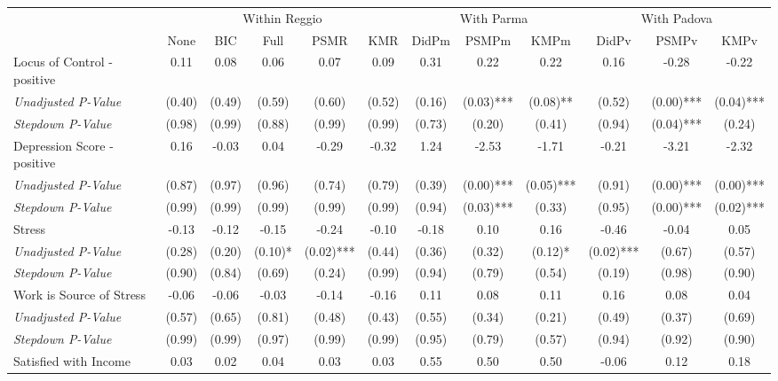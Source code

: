 \begin{tabular}{l c c c c c c c c c c c}
\toprule
& \multicolumn{5}{c}{Within Reggio} & \multicolumn{3}{c}{With Parma} & \multicolumn{3}{c}{With Padova} \\\cmidrule(lr){2-6} \cmidrule(lr){7-9} \cmidrule(lr){10-12}
 & None & BIC & Full & PSMR & KMR & DidPm & PSMPm & KMPm & DidPv & PSMPv & KMPv \\
\midrule
Locus of Control - positive & 0.11 & 0.08 & 0.06 & 0.07 & 0.09 & 0.31 & 0.22 & 0.22 & 0.16 & -0.28 & -0.22 \\
\quad \textit{Unadjusted P-Value} & (0.40) & (0.49) & (0.59) & (0.60) & (0.52) & (0.16) & (0.03)*** & (0.08)** & (0.52) & (0.00)*** & (0.04)*** \\
\quad \textit{Stepdown P-Value} & (0.98) & (0.99) & (0.88) & (0.99) & (0.99) & (0.73) & (0.20) & (0.41) & (0.94) & (0.04)*** & (0.24) \\
Depression Score - positive & 0.16 & -0.03 & 0.04 & -0.29 & -0.32 & 1.24 & -2.53 & -1.71 & -0.21 & -3.21 & -2.32 \\
\quad \textit{Unadjusted P-Value} & (0.87) & (0.97) & (0.96) & (0.74) & (0.79) & (0.39) & (0.00)*** & (0.05)*** & (0.91) & (0.00)*** & (0.00)*** \\
\quad \textit{Stepdown P-Value} & (0.99) & (0.99) & (0.99) & (0.99) & (0.99) & (0.94) & (0.03)*** & (0.33) & (0.95) & (0.00)*** & (0.02)*** \\
Stress & -0.13 & -0.12 & -0.15 & -0.24 & -0.10 & -0.18 & 0.10 & 0.16 & -0.46 & -0.04 & 0.05 \\
\quad \textit{Unadjusted P-Value} & (0.28) & (0.20) & (0.10)* & (0.02)*** & (0.44) & (0.36) & (0.32) & (0.12)* & (0.02)*** & (0.67) & (0.57) \\
\quad \textit{Stepdown P-Value} & (0.90) & (0.84) & (0.69) & (0.24) & (0.99) & (0.94) & (0.79) & (0.54) & (0.19) & (0.98) & (0.90) \\
Work is Source of Stress & -0.06 & -0.06 & -0.03 & -0.14 & -0.16 & 0.11 & 0.08 & 0.11 & 0.16 & 0.08 & 0.04 \\
\quad \textit{Unadjusted P-Value} & (0.57) & (0.65) & (0.81) & (0.48) & (0.43) & (0.55) & (0.34) & (0.21) & (0.49) & (0.37) & (0.69) \\
\quad \textit{Stepdown P-Value} & (0.99) & (0.99) & (0.97) & (0.99) & (0.99) & (0.95) & (0.79) & (0.57) & (0.94) & (0.92) & (0.90) \\
Satisfied with Income & 0.03 & 0.02 & 0.04 & 0.03 & 0.03 & 0.55 & 0.50 & 0.50 & -0.06 & 0.12 & 0.18 \\

\end{tabular}

